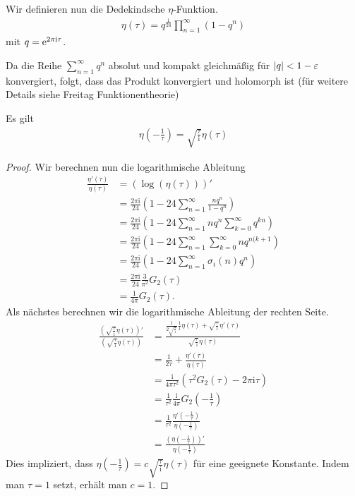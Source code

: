 \begin{defi}
Wir definieren nun die Dedekindsche $\eta$-Funktion.
\begin{align*}
\eta(\tau)=q^{\frac{1}{24}} \prod_{n=1}^\infty(1-q^n)
\end{align*}
mit $q=\mathrm{e}^{2\pi \mathrm{i}\tau}$.
\end{defi}
Da die Reihe $\sum_{n=1}^\infty q^n$ absolut und kompakt gleichmäßig für $\left\vert q\right\vert<1-\varepsilon$ konvergiert, folgt,
dass das Produkt konvergiert und holomorph ist (für weitere Details siehe Freitag Funktionentheorie)

\begin{prop}
Es gilt
\begin{align*}
\eta(-\frac{1}{\tau})=\sqrt{\frac{\tau}{\mathrm{i}}} \eta(\tau)
\end{align*}
\end{prop}
\begin{proof}
Wir berechnen nun die logarithmische Ableitung
\begin{align*}
\frac{\eta'(\tau)}{\eta(\tau)}&=\left(\log(\eta(\tau))\right)'\\
&=\frac{2\pi \mathrm{i}}{24}\left(1-24 \sum_{n=1}^\infty \frac{nq^n}{1-q^n}\right)\\
&=\frac{2\pi\mathrm{i}}{24} \left(1-24 \sum_{n=1}^\infty nq^n \sum_{k=0}^\infty q^{kn} \right)\\
&=\frac{2\pi \mathrm{i}}{24}\left(1-24 \sum_{n=1}^\infty \sum_{k=0}^\infty nq^{n(k+1} \right)\\
&=\frac{2\pi \mathrm{i}}{24}\left(1-24 \sum_{n=1}^\infty \sigma_i(n)q^n\right)\\
&=\frac{2\pi \mathrm{i}}{24} \frac{3}{\pi^2}G_2(\tau)\\
&=\frac{1}{4 \pi} G_2(\tau).
\end{align*}
Als nächstes berechnen wir die logarithmische Ableitung der rechten Seite.
\begin{align*}
\frac{\left(\sqrt{\frac{\tau}{\mathrm{i}}}\eta(\tau)\right)'}{\left(\sqrt{\frac{\tau}{\mathrm{i}}}\eta(\tau)\right)}&= \frac{\frac{1}{2 \sqrt{\frac{\tau}{\mathrm{i}}}}\frac{1}{\mathrm{i}}\eta(\tau)+\sqrt{\frac{\tau}{\mathrm{i}}}\eta'(\tau)}{\sqrt{\frac{\tau}{\mathrm{i}}}\eta(\tau)}\\
&=\frac{1}{2 \tau} +\frac{\eta'(\tau)}{\eta(\tau)}\\
&=\frac{\mathrm{i}}{4\pi \tau^2}\left(\tau^2 G_2(\tau)-2\pi \mathrm{i}\tau\right)\\
&=\frac{1}{\tau^2}\frac{\mathrm{i}}{4\pi} G_2\left(-\frac{1}{\tau}\right)\\
&=\frac{1}{\tau^2} \frac{\eta'\left(-\frac{1}{\tau}\right)}{\eta\left(-\frac{1}{\tau}\right)}\\
&=\frac{\left(\eta\left(-\frac{1}{\tau}\right)\right)'}{\eta\left(-\frac{1}{\tau}\right)}
\end{align*}
Dies impliziert, dass $\eta\left(-\frac{1}{\tau}\right)=c\sqrt{\frac{\tau}{\mathrm{i}}} \eta(\tau)$ für eine geeignete Konstante.
Indem man $\tau=1$ setzt, erhält man $c=1$.
\end{proof}

